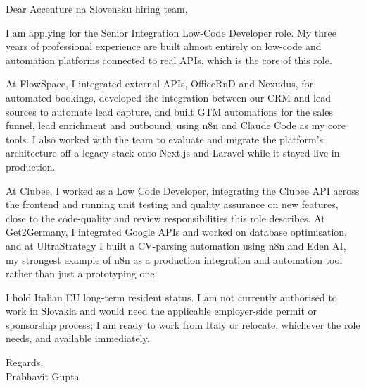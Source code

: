 \documentclass[a4paper,11pt]{article}
\begin{document}
Dear Accenture na Slovensku hiring team,

I am applying for the Senior Integration Low-Code Developer role. My three years of professional experience are built almost entirely on low-code and automation platforms connected to real APIs, which is the core of this role.

At FlowSpace, I integrated external APIs, OfficeRnD and Nexudus, for automated bookings, developed the integration between our CRM and lead sources to automate lead capture, and built GTM automations for the sales funnel, lead enrichment and outbound, using n8n and Claude Code as my core tools. I also worked with the team to evaluate and migrate the platform's architecture off a legacy stack onto Next.js and Laravel while it stayed live in production.

At Clubee, I worked as a Low Code Developer, integrating the Clubee API across the frontend and running unit testing and quality assurance on new features, close to the code-quality and review responsibilities this role describes. At Get2Germany, I integrated Google APIs and worked on database optimisation, and at UltraStrategy I built a CV-parsing automation using n8n and Eden AI, my strongest example of n8n as a production integration and automation tool rather than just a prototyping one.

I hold Italian EU long-term resident status. I am not currently authorised to work in Slovakia and would need the applicable employer-side permit or sponsorship process; I am ready to work from Italy or relocate, whichever the role needs, and available immediately.

Regards,\\
Prabhavit Gupta
\end{document}
